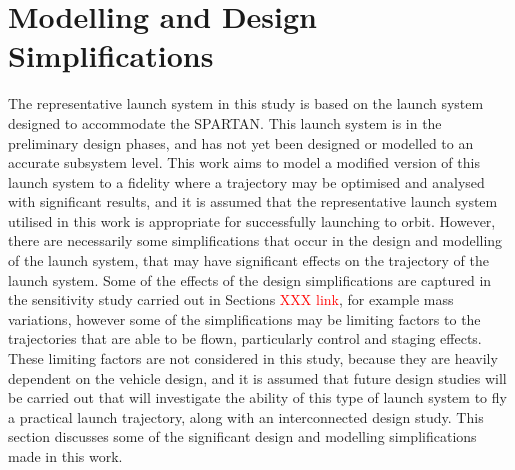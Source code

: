  






\section{Modelling and Design Simplifications}




The representative launch system in this study is based on the launch system designed to accommodate the SPARTAN\cite{Preller2017b}. This launch system is in the preliminary design phases, and has not yet been designed or modelled to an accurate subsystem level. This work aims to model a modified version of this launch system to a fidelity where a trajectory may be optimised and analysed with significant results, and it is assumed that the representative launch system utilised in this work is appropriate for successfully launching to orbit.
 However, there are necessarily some simplifications that occur in the design and modelling of the launch system, that may have significant effects on the trajectory of the launch system. Some of the effects of the design simplifications are captured in the sensitivity study carried out in Sections \textcolor{red}{XXX link}, for example mass variations, however some of the simplifications may be limiting factors to the trajectories that are able to be flown, particularly control and staging effects. These limiting factors are not considered in this study, because they are heavily dependent on the vehicle design, and it is assumed that future design studies will be carried out that will investigate the ability of this type of launch system to fly a practical launch trajectory, along with an interconnected design study. 
This section discusses some of the significant design and modelling simplifications made in this work.



